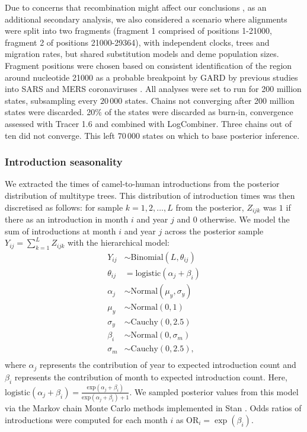 \documentclass[11pt,oneside,letterpaper]{article}
\begin{document}
Due to concerns that recombination might affect our conclusions \citep{dudas_mers-cov_2016}, as an additional secondary analysis, we also considered a scenario where alignments were split into two fragments (fragment 1 comprised of positions 1-21000, fragment 2 of positions 21000-29364), with independent clocks, trees and migration rates, but shared substitution models and deme population sizes.
Fragment positions were chosen based on consistent identification of the region around nucleotide 21000 as a probable breakpoint by GARD \citep{pond_gard:_2006} by previous studies into SARS and MERS coronaviruses \citep{hon_evidence_2008,dudas_mers-cov_2016}.
All analyses were set to run for 200 million states, subsampling every $20\,000$ states.
Chains not converging after 200 million states were discarded.
20\% of the states were discarded as burn-in, convergence assessed with Tracer 1.6 and combined with LogCombiner.
Three chains out of ten did not converge.
This left $70\,000$ states on which to base posterior inference.

\subsubsection*{Introduction seasonality}

We extracted the times of camel-to-human introductions from the posterior distribution of multitype trees.
This distribution of introduction times was then discretised as follows: for sample  $k = 1, 2, \ldots, L$ from the posterior,  $Z_{ijk}$ was $1$ if there as an introduction in month $i$ and year $j$ and $0$ otherwise.
We model the sum of introductions at month $i$ and year $j$ across the posterior sample $Y_{ij} = \sum_{k = 1}^L Z_{ijk}$ with the hierarchical model:
\begin{align*}
  Y_{ij} &\sim \text{Binomial}(L, \theta_{ij}) \\
  \theta_{ij} &= \mathrm{logistic}(\alpha_j + \beta_i) \\
  \alpha_j &\sim \text{Normal}(\mu_{y}, \sigma_{y}) \\
  \mu_{y}  &\sim  \text{Normal}(0, 1) \\
  \sigma_{y} &\sim \text{Cauchy}(0, 2.5) \\
  \beta_i &\sim \text{Normal}(0, \sigma_{m}) \\
  \sigma_{m} &\sim \text{Cauchy}(0, 2.5), \\
\end{align*}
where $\alpha_j$ represents the contribution of year to expected introduction count and $\beta_i$ represents the contribution of month to expected introduction count.
Here, $\mathrm{logistic}(\alpha_j + \beta_i) =  \frac{\mathrm{exp}(\alpha_j + \beta_i)}{\mathrm{exp}(\alpha_j + \beta_i) + 1}$.
We sampled posterior values from this model via the Markov chain Monte Carlo methods implemented in Stan \citep{carpenter_stan_2016}.
Odds ratios of introductions were computed for each month $i$ as $\text{OR}_i = \exp(\beta_i)$.
\end{document}
